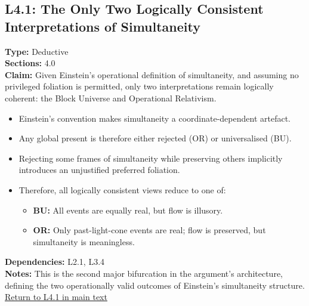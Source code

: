 \documentclass[12pt]{book}
\newcommand{\returnlink}[1]{\hyperref[logic:#1]{Return to #1 in main text}\xspace}
\begin{document}
\subsection*{L4.1: The Only Two Logically Consistent Interpretations of Simultaneity}\label{appendix:L4.1}
\textbf{Type:} Deductive \\
\textbf{Sections:} 4.0 \\
\textbf{Claim:} Given Einstein's operational definition of simultaneity, and assuming no privileged foliation is permitted, only two interpretations remain logically coherent: the Block Universe and Operational Relativism.
\begin{itemize}
  \item Einstein's convention makes simultaneity a coordinate-dependent artefact.
  \item Any global present is therefore either rejected (OR) or universalised (BU).
  \item Rejecting some frames of simultaneity while preserving others implicitly introduces an unjustified preferred foliation.
  \item Therefore, all logically consistent views reduce to one of:
  \begin{itemize}
    \item \textbf{BU:} All events are equally real, but flow is illusory.
    \item \textbf{OR:} Only past-light-cone events are real; flow is preserved, but simultaneity is meaningless.
  \end{itemize}
\end{itemize}
\textbf{Dependencies:} L2.1, L3.4 \\
\textbf{Notes:} This is the second major bifurcation in the argument's architecture, defining the two operationally valid outcomes of Einstein's simultaneity structure. \\
\returnlink{L4.1}
\end{document}
